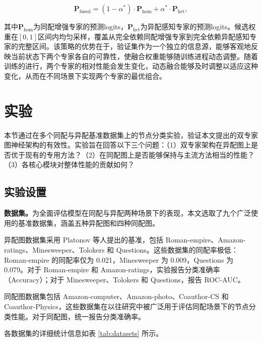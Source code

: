 \documentclass[a4paper,10pt]{article}
\begin{document}
\begin{equation}
\mathbf{P}_{\text{fused}} = (1 - \alpha^*) \cdot \mathbf{P}_{\text{hom}} + \alpha^* \cdot \mathbf{P}_{\text{het}},
\end{equation}

其中$\mathbf{P}_{\text{hom}}$为同配增强专家的预测logits，$\mathbf{P}_{\text{het}}$为异配感知专家的预测logits。候选权重在$[0,1]$区间内均匀采样，覆盖从完全依赖同配增强专家到完全依赖异配感知专家的完整区间。该策略的优势在于，验证集作为一个独立的信息源，能够客观地反映当前状态下两个专家各自的可靠性，使融合权重能够随训练进程动态调整。随着训练的进行，两个专家的相对性能会发生变化，动态融合能够及时调整以适应这种变化，从而在不同场景下实现两个专家的最优组合。

\section{实验}

本节通过在多个同配与异配基准数据集上的节点分类实验，验证本文提出的双专家图神经架构的有效性。实验旨在回答以下三个问题：（1）双专家架构在异配图上是否优于现有的专用方法？（2）在同配图上是否能够保持与主流方法相当的性能？（3）各核心模块对整体性能的贡献如何？

\subsection{实验设置}

\noindent\textbf{数据集。}为全面评估模型在同配与异配两种场景下的表现，本文选取了九个广泛使用的基准数据集，涵盖五种异配图和四种同配图。

异配图数据集采用 Platonov 等人提出的基准，包括 Roman-empire、Amazon-ratings、Minesweeper、Tolokers 和 Questions。这些数据集的同配率极低：Roman-empire 的同配率仅为 0.021，Minesweeper 为 0.009，Questions 为 0.079。对于 Roman-empire 和 Amazon-ratings，实验报告分类准确率（Accuracy）；对于 Minesweeper、Tolokers 和 Questions，报告 ROC-AUC。

同配图数据集包括 Amazon-computer、Amazon-photo、Coauthor-CS 和 Coauthor-Physics，这些数据集在以往研究中被广泛用于评估同配场景下的节点分类性能。对于同配图，统一报告分类准确率。

各数据集的详细统计信息如表 \ref{tab:datasets} 所示。
\end{document}
